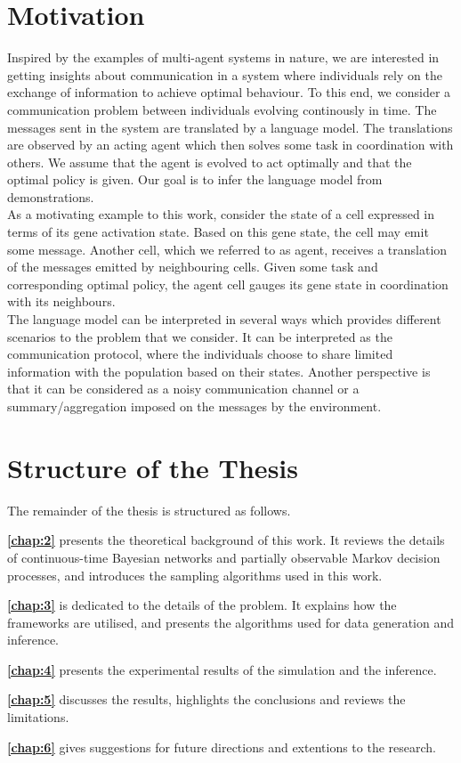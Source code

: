 \section{Motivation}
Inspired by the examples of multi-agent systems in nature, we are interested in getting insights about communication in a system where individuals rely on the exchange of information to achieve optimal behaviour. To this end, we consider a communication problem between individuals evolving continously in time. The messages sent in the system are translated by a language model. The translations are observed by an acting agent which then solves some task in coordination with others. We assume that the agent is evolved to act optimally and that the optimal policy is given. Our goal is to infer the language model from demonstrations.\\
As a motivating example to this work, consider the state of a cell expressed in terms of its gene activation state. Based on this gene state, the cell may emit some message. Another cell, which we referred to as agent, receives a translation of the messages emitted by neighbouring cells. Given some task and corresponding optimal policy, the agent cell gauges its gene state in coordination with its neighbours.\\
The language model can be interpreted in several ways which provides different scenarios to the problem that we consider. It can be interpreted as the communication protocol, where the individuals choose to share limited information with the population based on their states. Another perspective is that it can be considered as a noisy communication channel or a summary/aggregation imposed on the messages by the environment. 
\pagebreak
\section{Structure of the Thesis}
The remainder of the thesis is structured as follows.

\textbf{\cref{chap:2}} presents the theoretical background of this work. It reviews the details of continuous-time Bayesian networks and partially observable Markov decision processes, and introduces the sampling algorithms used in this work.

\textbf{\cref{chap:3}} is dedicated to the details of the problem. It explains how the frameworks are utilised, and presents the algorithms used for data generation and inference.

\textbf{\cref{chap:4}} presents the experimental results of the simulation and the inference.

\textbf{\cref{chap:5}} discusses the results, highlights the conclusions and reviews the limitations.

\textbf{\cref{chap:6}} gives suggestions for future directions and extentions to the research.
